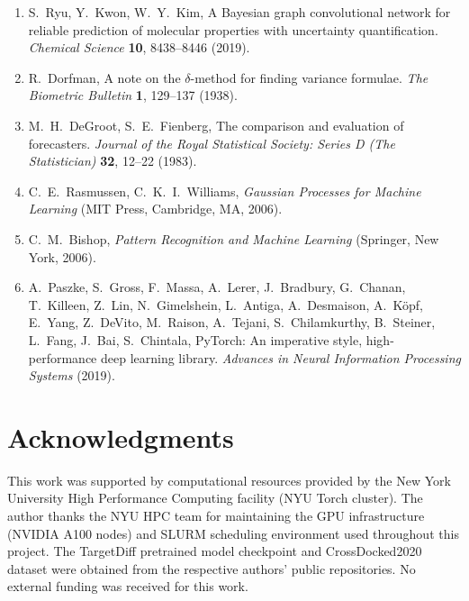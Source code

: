 \documentclass{article}
\begin{document}
\begin{enumerate}[leftmargin=2em,itemsep=1pt,label=\textit{\arabic*}.]
\item S.~Ryu, Y.~Kwon, W.~Y.~Kim,
  A Bayesian graph convolutional network for reliable prediction of
  molecular properties with uncertainty quantification.
  \textit{Chemical Science} \textbf{10}, 8438--8446 (2019).

\item R.~Dorfman,
  A note on the $\delta$-method for finding variance formulae.
  \textit{The Biometric Bulletin} \textbf{1}, 129--137 (1938).

\item M.~H.~DeGroot, S.~E.~Fienberg,
  The comparison and evaluation of forecasters.
  \textit{Journal of the Royal Statistical Society: Series D
  (The Statistician)} \textbf{32}, 12--22 (1983).

\item C.~E.~Rasmussen, C.~K.~I.~Williams,
  \textit{Gaussian Processes for Machine Learning} (MIT Press,
  Cambridge, MA, 2006).

\item C.~M.~Bishop,
  \textit{Pattern Recognition and Machine Learning} (Springer,
  New York, 2006).

\item A.~Paszke, S.~Gross, F.~Massa, A.~Lerer, J.~Bradbury,
  G.~Chanan, T.~Killeen, Z.~Lin, N.~Gimelshein, L.~Antiga,
  A.~Desmaison, A.~K\"opf, E.~Yang, Z.~DeVito, M.~Raison,
  A.~Tejani, S.~Chilamkurthy, B.~Steiner, L.~Fang, J.~Bai,
  S.~Chintala,
  PyTorch: An imperative style, high-performance deep learning library.
  \textit{Advances in Neural Information Processing Systems} (2019).

\end{enumerate}


\section*{Acknowledgments}

This work was supported by computational resources provided by the New
York University High Performance Computing facility (NYU Torch cluster).
The author thanks the NYU HPC team for maintaining the GPU
infrastructure (NVIDIA A100 nodes) and SLURM scheduling environment used
throughout this project.  The TargetDiff pretrained model checkpoint and
CrossDocked2020 dataset were obtained from the respective authors'
public repositories.  No external funding was received for this work.


\end{document}
